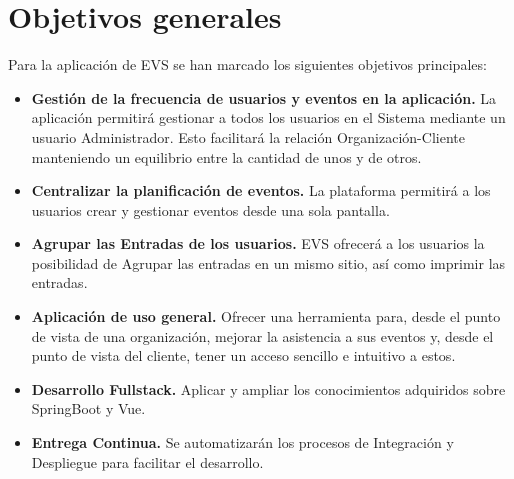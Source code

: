 
\section{Objetivos generales}

Para la aplicación de EVS se han marcado los siguientes objetivos principales:
\begin{itemize}
    \item \textbf{Gestión de la frecuencia de usuarios y eventos en la aplicación.} La aplicación permitirá gestionar a todos los usuarios en el Sistema
    mediante un usuario Administrador. Esto facilitará la relación Organización-Cliente manteniendo un equilibrio entre la cantidad de unos y de otros.
    \item \textbf{Centralizar la planificación de eventos.} La plataforma permitirá a los usuarios crear y gestionar eventos desde una sola pantalla.
    \item \textbf{Agrupar las Entradas de los usuarios.}  EVS ofrecerá a los usuarios la posibilidad de Agrupar las entradas en un mismo sitio, así como imprimir las entradas.
    \item \textbf{Aplicación de uso general.} Ofrecer una herramienta para, desde el punto de vista de una organización, mejorar la asistencia a sus eventos
    y, desde el punto de vista del cliente, tener un acceso sencillo e intuitivo a estos.
    \item \textbf{Desarrollo Fullstack.} Aplicar y ampliar los conocimientos adquiridos sobre SpringBoot y Vue.
    \item \textbf{Entrega Continua.} Se automatizarán los procesos de Integración y Despliegue para facilitar el desarrollo.
    \end{itemize}
   

